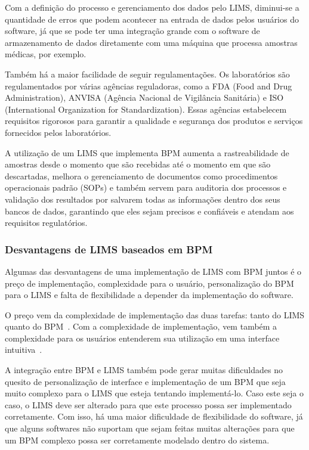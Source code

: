 Com a definição do processo e gerenciamento dos dados pelo LIMS, diminui-se a quantidade de erros que podem acontecer na entrada de dados pelos usuários do software, já que se pode ter uma integração grande com o software de armazenamento de dados diretamente com uma máquina que processa amostras médicas, por exemplo.

Também há a maior facilidade de seguir regulamentações. Os laboratórios são regulamentados por várias agências reguladoras, como a FDA (Food and Drug Administration), ANVISA (Agência Nacional de Vigilância Sanitária) e ISO (International Organization for Standardization). Essas agências estabelecem requisitos rigorosos para garantir a qualidade e segurança dos produtos e serviços fornecidos pelos laboratórios.

A utilização de um LIMS que implementa BPM aumenta a rastreabilidade de amostras desde o momento que são recebidas até o momento em que são descartadas, melhora o gerenciamento de documentos como procedimentos operacionais padrão (SOPs) e também servem para auditoria dos processos e validação dos resultados por salvarem todas as informações dentro dos seus bancos de dados, garantindo que eles sejam precisos e confiáveis e atendam aos requisitos regulatórios.


\subsubsection{Desvantagens de LIMS baseados em BPM}

Algumas das desvantagens de uma implementação de LIMS com BPM juntos é o preço de implementação, complexidade para o usuário, personalização do BPM para o LIMS e falta de flexibilidade a depender da implementação do software.

O preço vem da complexidade de implementação das duas tarefas: tanto do LIMS quanto do BPM~\cite{Mutschler2013UnderstandingTechnology}. Com a complexidade de implementação, vem também a complexidade para os usuários entenderem sua utilização em uma interface intuitiva~\cite{Cardoso2006AModels}.

A integração entre BPM e LIMS também pode gerar muitas dificuldades no quesito de personalização de interface e implementação de um BPM que seja muito complexo para o LIMS que esteja tentando implementá-lo. Caso este seja o caso, o LIMS deve ser alterado para que este processo possa ser implementado corretamente. Com isso, há uma maior dificuldade de flexibilidade do software, já que alguns softwares não suportam que sejam feitas muitas alterações para que um BPM complexo possa ser corretamente modelado dentro do sistema.